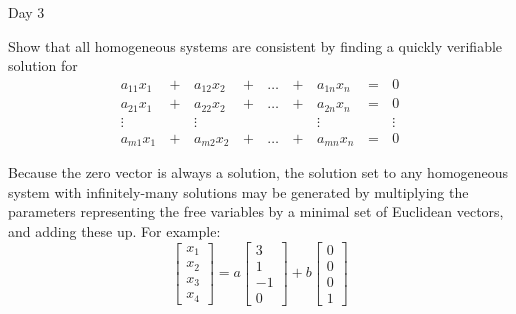 \begin{applicationActivities}{Day 3}
\begin{activity}{5}
  Show that all homogeneous systems are consistent by finding a
  quickly verifiable solution
  for
  \begin{alignat*}{5}
    a_{11}x_1 &\,+\,& a_{12}x_2 &\,+\,& \dots  &\,+\,& a_{1n}x_n &\,=\,& 0 \\
    a_{21}x_1 &\,+\,& a_{22}x_2 &\,+\,& \dots  &\,+\,& a_{2n}x_n &\,=\,& 0 \\
     \vdots&  &\vdots&   &&  &\vdots&&\vdots  \\
    a_{m1}x_1 &\,+\,& a_{m2}x_2 &\,+\,& \dots  &\,+\,& a_{mn}x_n &\,=\,& 0
  \end{alignat*}
\end{activity}

\begin{fact}
  Because the zero vector is always a solution,
  the solution set to any homogeneous system with infinitely-many solutions
  may be generated by multiplying the parameters representing the free variables
  by a minimal set of Euclidean vectors, and adding these up. For example:
  \[
    \begin{bmatrix}
      x_1 \\
      x_2 \\
      x_3 \\
      x_4
    \end{bmatrix}=
    a\begin{bmatrix}
      3 \\
      1 \\
      -1 \\
      0
    \end{bmatrix}+
    b\begin{bmatrix}
      0 \\
      0 \\
      0 \\
      1
    \end{bmatrix}
  \]
\end{fact}


\end{applicationActivities}
